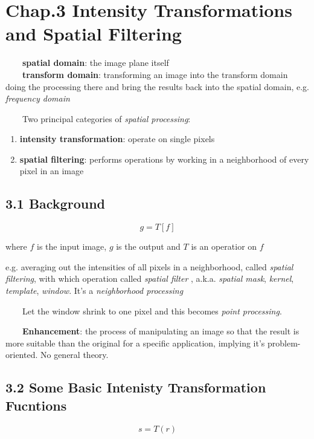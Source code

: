 \documentclass[]{article}
\begin{document}
\section{Chap.3 Intensity Transformations and Spatial
Filtering}\label{header-n110}

\(\qquad\)\textbf{spatial domain}: the image plane itself\\
 \(\qquad\)\textbf{transform domain}: transforming an image into the
transform domain doing the processing there and bring the results back
into the spatial domain, e.g. \emph{frequency domain}

\(\qquad\)Two principal categories of \emph{spatial processing}:

\begin{enumerate}
\def\labelenumi{\arabic{enumi}.}
\item
  \textbf{intensity transformation}: operate on single pixels
\item
  \textbf{spatial filtering}: performs operations by working in a
  neighborhood of every pixel in an image
\end{enumerate}

\subsection{3.1 Background}\label{header-n123}

\[g=T[f]\]

where \(f\) is the input image, \(g\) is the output and \(T\) is an
operatior on \(f\)

e.g. averaging out the intensities of all pixels in a neighborhood,
called \emph{spatial filtering}, with which operation called
\emph{spatial filter} , a.k.a. \emph{spatial mask}, \emph{kernel},
\emph{template}, \emph{window}. It's a \emph{neighborhood processing}

\(\qquad\)Let the window shrink to one pixel and this becomes
\emph{point processing}.

\(\qquad\)\textbf{Enhancement}: the process of manipulating an image so
that the result is more suitable than the original for a specific
application, implying it's problem-oriented. No general theory.

\subsection{3.2 Some Basic Intenisty Transformation
Fucntions}\label{header-n133}

\[s=T(r)\]
\end{document}
